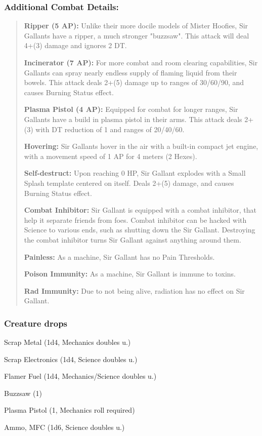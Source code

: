 \documentclass[11pt,a4paper,twocolumn]{book}
\begin{document}
	\subsubsection*{Additional Combat Details:}
	\begin{verse}
		\textbf{Ripper (5 AP):} Unlike their more docile models of Mister Hoofies, Sir Gallants have a ripper, a much stronger "buzzsaw". This attack will deal 4+(3) damage and ignores 2 DT.
		
		\textbf{Incinerator (7 AP):} For more combat and room clearing capabilities, Sir Gallants can spray nearly endless supply of flaming liquid from their bowels. This attack deals 2+(5) damage up to ranges of 30/60/90, and causes Burning Status effect.
		
		\textbf{Plasma Pistol (4 AP):} Equipped for combat for longer ranges, Sir Gallants have a build in plasma pistol in their arms. This attack deals 2+(3) with DT reduction of 1 and ranges of 20/40/60.
		
		\textbf{Hovering:} Sir Gallants hover in the air with a built-in compact jet engine, with a movement speed of 1 AP for 4 meters (2 Hexes).
		
		\textbf{Self-destruct:} Upon reaching 0 HP, Sir Gallant explodes with a Small Splash template centered on itself. Deals 2+(5) damage, and causes Burning Status effect. 
		
		\textbf{Combat Inhibitor:} Sir Gallant is equipped with a combat inhibitor, that help it separate friends from foes. Combat inhibitor can be hacked with Science to various ends, such as shutting down the Sir Gallant. Destroying the combat inhibitor turns Sir Gallant against anything around them. 
		
		\textbf{Painless:} As a machine, Sir Gallant has no Pain Thresholds.
		
		\textbf{Poison Immunity:} As a machine, Sir Gallant is immune to toxins.
		
		\textbf{Rad Immunity:} Due to not being alive, radiation has no effect on Sir Gallant.
	\end{verse}
	
	\subsubsection*{Creature drops}
	\begin{compactitem}
		\item Scrap Metal (1d4, Mechanics doubles u.)
		\item Scrap Electronics (1d4, Science doubles u.)
		\item Flamer Fuel (1d4, Mechanics/Science doubles u.)
		\item Buzzsaw (1)
		\item Plasma Pistol (1, Mechanics roll required)
		\item Ammo, MFC (1d6, Science doubles u.)
	\end{compactitem}
	
\end{document}
